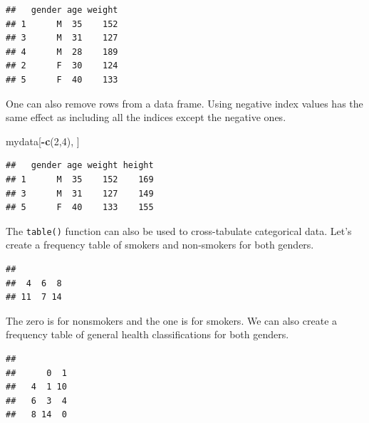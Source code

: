 \documentclass[
]{book}
\newenvironment{Shaded}{\begin{snugshade}}{\end{snugshade}}
\newcommand{\DecValTok}[1]{\textcolor[rgb]{0.00,0.00,0.81}{#1}}
\newcommand{\KeywordTok}[1]{\textcolor[rgb]{0.13,0.29,0.53}{\textbf{#1}}}
\newcommand{\NormalTok}[1]{#1}
\newcommand{\OperatorTok}[1]{\textcolor[rgb]{0.81,0.36,0.00}{\textbf{#1}}}
\begin{document}
\begin{verbatim}
##   gender age weight
## 1      M  35    152
## 3      M  31    127
## 4      M  28    189
## 2      F  30    124
## 5      F  40    133
\end{verbatim}

One can also remove rows from a data frame. Using negative index values has the same effect as including all the indices except the negative ones.

\begin{Shaded}
\begin{Highlighting}[]
\NormalTok{mydata[}\OperatorTok{-}\KeywordTok{c}\NormalTok{(}\DecValTok{2}\NormalTok{,}\DecValTok{4}\NormalTok{), ]}
\end{Highlighting}
\end{Shaded}

\begin{verbatim}
##   gender age weight height
## 1      M  35    152    169
## 3      M  31    127    149
## 5      F  40    133    155
\end{verbatim}

The \texttt{table()} function can also be used to cross-tabulate categorical data. Let's create a frequency table of smokers and non-smokers for both genders.

\begin{Shaded}
\end{Shaded}

\begin{verbatim}
## 
##  4  6  8 
## 11  7 14
\end{verbatim}

The zero is for nonsmokers and the one is for smokers. We can also create a frequency table of general health classifications for both genders.

\begin{Shaded}
\end{Shaded}

\begin{verbatim}
##    
##      0  1
##   4  1 10
##   6  3  4
##   8 14  0
\end{verbatim}
\end{document}
